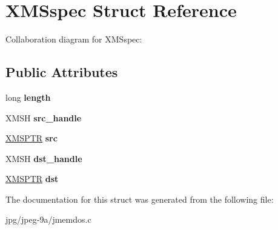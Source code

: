 \hypertarget{struct_x_m_sspec}{\section{X\+M\+Sspec Struct Reference}
\label{struct_x_m_sspec}
}


Collaboration diagram for X\+M\+Sspec\+:
\subsection*{Public Attributes}
\begin{DoxyCompactItemize}
\item 
\hypertarget{struct_x_m_sspec_ab8f35573bf6f49ddabd5ca36c8231393}{long {\bfseries length}}\label{struct_x_m_sspec_ab8f35573bf6f49ddabd5ca36c8231393}

\item 
\hypertarget{struct_x_m_sspec_a20d6b59c699cfa09599d5a0047fdb856}{X\+M\+S\+H {\bfseries src\+\_\+handle}}\label{struct_x_m_sspec_a20d6b59c699cfa09599d5a0047fdb856}

\item 
\hypertarget{struct_x_m_sspec_a4b5265e0963f282e1d38833a32c48514}{\hyperlink{union_x_m_s_p_t_r}{X\+M\+S\+P\+T\+R} {\bfseries src}}\label{struct_x_m_sspec_a4b5265e0963f282e1d38833a32c48514}

\item 
\hypertarget{struct_x_m_sspec_a6af469e471e4480962aa2b2614b4f341}{X\+M\+S\+H {\bfseries dst\+\_\+handle}}\label{struct_x_m_sspec_a6af469e471e4480962aa2b2614b4f341}

\item 
\hypertarget{struct_x_m_sspec_a9fd069160fa64dfb5d36ec11b3694dee}{\hyperlink{union_x_m_s_p_t_r}{X\+M\+S\+P\+T\+R} {\bfseries dst}}\label{struct_x_m_sspec_a9fd069160fa64dfb5d36ec11b3694dee}

\end{DoxyCompactItemize}


The documentation for this struct was generated from the following file\+:\begin{DoxyCompactItemize}
\item 
jpg/jpeg-\/9a/jmemdos.\+c\end{DoxyCompactItemize}
